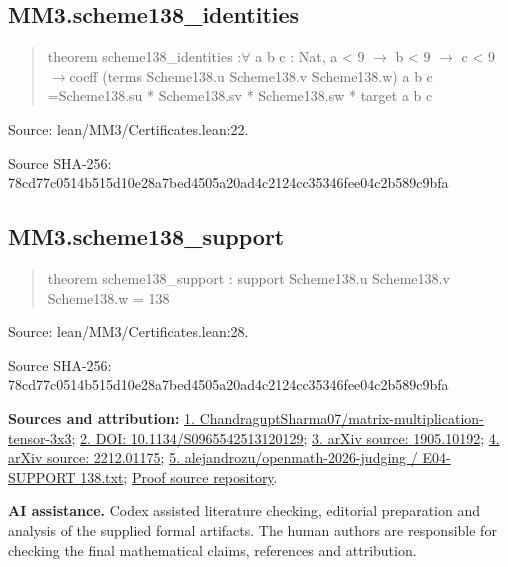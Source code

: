 \documentclass[11pt,a4paper]{article}
\begin{document}
\begin{samepage}
\subsection{MM3.scheme138\_identities}
\begin{quote}\small\ttfamily theorem scheme138\_identities :\newline     \ensuremath{\forall} a b c : Nat, a < 9 \ensuremath{\to} b < 9 \ensuremath{\to} c < 9 \ensuremath{\to}\newline       coeff (terms Scheme138.u Scheme138.v Scheme138.w) a b c =\newline         Scheme138.su * Scheme138.sv * Scheme138.sw * target a b c\end{quote}
{\small Source: lean/MM3/Certificates.lean:22.\par}

{\small Source SHA-256: 78cd77c0514b515d10e28a7bed4505a20ad4c2124cc35346fee04c2b589c9bfa\par}

\end{samepage}
\begin{samepage}
\subsection{MM3.scheme138\_support}
\begin{quote}\small\ttfamily theorem scheme138\_support : support Scheme138.u Scheme138.v Scheme138.w = 138\end{quote}
{\small Source: lean/MM3/Certificates.lean:28.\par}

{\small Source SHA-256: 78cd77c0514b515d10e28a7bed4505a20ad4c2124cc35346fee04c2b589c9bfa\par}

{\small\textbf{Sources and attribution:} \href{https://github.com/ChandraguptSharma07/matrix-multiplication-tensor-3x3/tree/479c2416b6261ee841052eef4881df0e40054f3f}{1. ChandraguptSharma07/matrix-multiplication-tensor-3x3}; \href{https://doi.org/10.1134/S0965542513120129}{2. DOI: 10.1134/S0965542513120129}; \href{https://arxiv.org/abs/1905.10192}{3. arXiv source: 1905.10192}; \href{https://arxiv.org/abs/2212.01175}{4. arXiv source: 2212.01175}; \href{https://github.com/alejandrozu/openmath-2026-judging/blob/d0ed487f487fa7ec814ff705ab55249983fe8707/OpenMath-Judging/review/entries/E04-SUPPORT138.txt}{5. alejandrozu/openmath-2026-judging / E04-SUPPORT 138.txt}; \href{https://github.com/alejandrozu/openmath-2026-judging}{Proof source repository}.\par}

\end{samepage}
{\small \textbf{AI assistance.} Codex assisted literature checking, editorial preparation and analysis of the supplied formal artifacts. The human authors are responsible for checking the final mathematical claims, references and attribution.\par}
\end{document}
